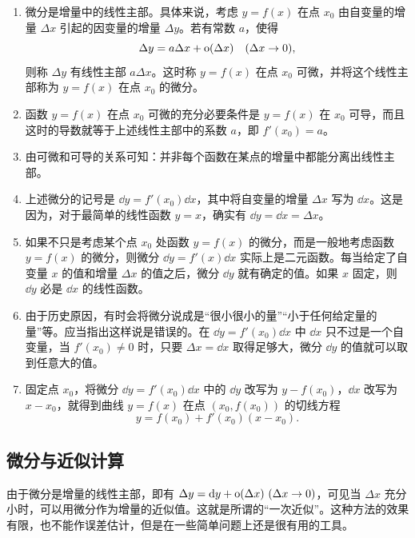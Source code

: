\begin{enumerate}
  \item 微分是增量中的线性主部。具体来说，考虑 $y=f(x)$ 在点 $x_0$ 由自变量的增量 $\Delta x$ 引起的因变量的增量 $\Delta y$。若有常数 $a$，使得
  \[
    \Delta y=a\Delta x+\mathrm{o}(\Delta x)\quad(\Delta x\to0),
  \]
  则称 $\Delta y$ 有线性主部 $a\Delta x$。这时称 $y=f(x)$ 在点 $x_0$ 可微，并将这个线性主部称为 $y=f(x)$ 在点 $x_0$ 的微分。
  \item 函数 $y=f(x)$ 在点 $x_0$ 可微的充分必要条件是 $y=f(x)$ 在 $x_0$ 可导，而且这时的导数就等于上述线性主部中的系数 $a$，即 $f'(x_0)=a$。
  \item 由可微和可导的关系可知：并非每个函数在某点的增量中都能分离出线性主部。
  \item 上述微分的记号是 $\dd y=f'(x_0)\dd x$，其中将自变量的增量 $\Delta x$ 写为 $\dd x$。这是因为，对于最简单的线性函数 $y=x$，确实有 $\dd y=\dd x=\Delta x$。
  \item 如果不只是考虑某个点 $x_0$ 处函数 $y=f(x)$ 的微分，而是一般地考虑函数 $y=f(x)$ 的微分，则微分 $\dd y=f'(x)\dd x$ 实际上是二元函数。每当给定了自变量 $x$ 的值和增量 $\Delta x$ 的值之后，微分 $\dd y$ 就有确定的值。如果 $x$ 固定，则 $\dd y$ 必是 $\dd x$ 的线性函数。
  \item 由于历史原因，有时会将微分说成是“很小很小的量”“小于任何给定量的量”等。应当指出这样说是错误的。在 $\dd y=f'(x_0)\dd x$ 中 $\dd x$ 只不过是一个自变量，当 $f'(x_0)\ne0$ 时，只要 $\Delta x=\dd x$ 取得足够大，微分 $\dd y$ 的值就可以取到任意大的值。
  \item 固定点 $x_0$，将微分 $\dd y=f'(x_0)\dd x$ 中的 $\dd y$ 改写为 $y-f(x_0)$，$\dd x$ 改写为 $x-x_0$，就得到曲线 $y=f(x)$ 在点 $(x_0,f(x_0))$ 的切线方程
  \[
    y=f(x_0)+f'(x_0)(x-x_0).
  \]
\end{enumerate}

\subsection{微分与近似计算}

由于微分是增量的线性主部，即有 $\Delta y=\mathop{}\!\mathrm{d} y+\mathrm{o}(\Delta x)\ (\Delta x\to0)$，可见当 $\Delta x$ 充分小时，可以用微分作为增量的近似值。这就是所谓的“一次近似”。这种方法的效果有限，也不能作误差估计，但是在一些简单问题上还是很有用的工具。

